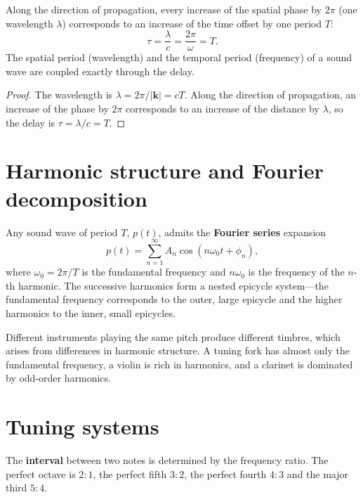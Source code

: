 \begin{proposition}\label{prop:acoustic_delay_phase_unity}
Along the direction of propagation, every increase of the spatial phase by $2\pi$ (one wavelength $\lambda$) corresponds to an increase of the time offset by one period $T$:
\[
\tau = \frac{\lambda}{c} = \frac{2\pi}{\omega} = T.
\]
The spatial period (wavelength) and the temporal period (frequency) of a sound wave are coupled exactly through the delay.
\end{proposition}

\begin{proof}
The wavelength is $\lambda = 2\pi/|\mathbf{k}| = cT$. Along the direction of propagation, an increase of the phase by $2\pi$ corresponds to an increase of the distance by $\lambda$, so the delay is $\tau = \lambda/c = T$.
\end{proof}

\section{Harmonic structure and Fourier decomposition}

\begin{definition}\label{def:harmonic_series}
Any sound wave of period $T$, $p(t)$, admits the \textbf{Fourier series} expansion
\[
p(t) = \sum_{n=1}^{\infty} A_n \cos(n\omega_0 t + \phi_n),
\]
where $\omega_0 = 2\pi/T$ is the fundamental frequency and $n\omega_0$ is the frequency of the $n$-th harmonic. The successive harmonics form a nested epicycle system---the fundamental frequency corresponds to the outer, large epicycle and the higher harmonics to the inner, small epicycles.
\end{definition}

\begin{example}\label{ex:instrument_timbre}
Different instruments playing the same pitch produce different timbres, which arises from differences in harmonic structure. A tuning fork has almost only the fundamental frequency, a violin is rich in harmonics, and a clarinet is dominated by odd-order harmonics.
\end{example}

\section{Tuning systems}

\begin{definition}\label{def:musical_interval}
The \textbf{interval} between two notes is determined by the frequency ratio. The perfect octave is $2:1$, the perfect fifth $3:2$, the perfect fourth $4:3$ and the major third $5:4$.
\end{definition}


